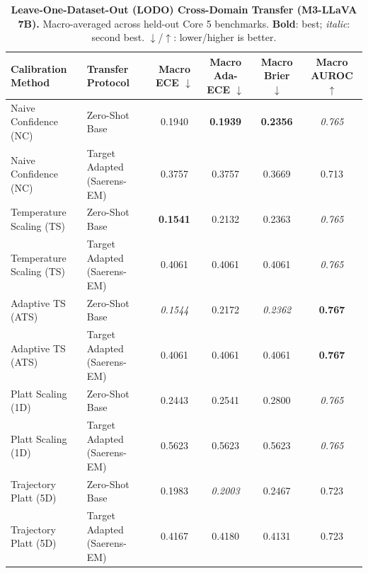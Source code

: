 \begin{table}[t]
\setlength{\tabcolsep}{4pt}
\renewcommand{\arraystretch}{1.05}
\centering
\footnotesize
\begin{tabular}{llcccc}
\toprule
\textbf{Calibration Method} & \textbf{Transfer Protocol} & \textbf{Macro ECE} $\downarrow$ & \textbf{Macro Ada-ECE} $\downarrow$ & \textbf{Macro Brier} $\downarrow$ & \textbf{Macro AUROC} $\uparrow$ \\
\midrule
Naive Confidence (NC) & Zero-Shot Base & 0.1940 & \textbf{0.1939} & \textbf{0.2356} & \textit{0.765} \\
Naive Confidence (NC) & Target Adapted (Saerens-EM) & 0.3757 & 0.3757 & 0.3669 & 0.713 \\
Temperature Scaling (TS) & Zero-Shot Base & \textbf{0.1541} & 0.2132 & 0.2363 & \textit{0.765} \\
Temperature Scaling (TS) & Target Adapted (Saerens-EM) & 0.4061 & 0.4061 & 0.4061 & \textit{0.765} \\
Adaptive TS (ATS) & Zero-Shot Base & \textit{0.1544} & 0.2172 & \textit{0.2362} & \textbf{0.767} \\
Adaptive TS (ATS) & Target Adapted (Saerens-EM) & 0.4061 & 0.4061 & 0.4061 & \textbf{0.767} \\
Platt Scaling (1D) & Zero-Shot Base & 0.2443 & 0.2541 & 0.2800 & \textit{0.765} \\
Platt Scaling (1D) & Target Adapted (Saerens-EM) & 0.5623 & 0.5623 & 0.5623 & \textit{0.765} \\
Trajectory Platt (5D) & Zero-Shot Base & 0.1983 & \textit{0.2003} & 0.2467 & 0.723 \\
Trajectory Platt (5D) & Target Adapted (Saerens-EM) & 0.4167 & 0.4180 & 0.4131 & 0.723 \\
\bottomrule
\end{tabular}
\caption{\textbf{Leave-One-Dataset-Out (LODO) Cross-Domain Transfer (M3-LLaVA 7B).} Macro-averaged across held-out Core 5 benchmarks. \textbf{Bold}: best; \textit{italic}: second best. $\downarrow$/$\uparrow$: lower/higher is better.}
\label{tab:lodo_transfer_m3}
\end{table}

